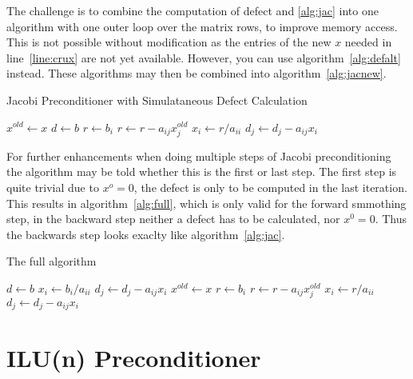 \documentclass{article}
\begin{document}
The challenge is to combine the computation of defect and \ref{alg:jac} into one algorithm with one outer loop over the matrix rows, to improve memory access. This is not possible without modification as the entries of the new $x$ needed in line~\ref{line:crux} are not yet available. However, you can use algorithm~\ref{alg:defalt} instead. These algorithms may then be combined into algorithm~\ref{alg:jacnew}.
\begin{algorithm}
\caption{Jacobi Preconditioner with Simulataneous Defect Calculation}
\label{alg:jacnew}
\begin{algorithmic}[1]
\State $x^{old}\gets x$
\State $d\gets b$
  \State $r\gets b_i$
    \State $r \gets r - a_{ij}x_j^{old}$
  \EndFor
  \State $x_i \gets r/a_{ii}$
    \State $d_j\gets d_j-a_{ij}x_i$
  \EndFor
\EndFor
\end{algorithmic}
\end{algorithm}

For further enhancements when doing multiple steps of Jacobi preconditioning the algorithm may be told whether this is the first or last step. The first step is quite trivial due to $x^o=0$, the defect is only to be computed in the last iteration. This results in algorithm~\ref{alg:full}, which is only valid for the forward smmothing step, in the backward step neither a defect has to be calculated, nor $x^0=0$. Thus the backwards step looks exaclty like algorithm~\ref{alg:jac}.

\begin{algorithm}
\caption{The full algorithm}
\label{alg:full}
\begin{algorithmic}[1]
  \State $d\gets b$
\EndIf
{}
    \State $x_i\gets b_i/a_{ii}$
  \EndFor
      \State $d_j\gets d_j - a_{ij}x_{i}$
    \EndFor
  \EndIf
\Else
  \State $x^{old}\gets x$
    \State $r\gets b_i$
      \State $r\gets r-a_{ij}x^{old}_j$
    \EndFor
    \State $x_i\gets r/a_{ii}$
        \State $d_j\gets d_j - a_{ij}x_{i}$
      \EndFor
    \EndIf
  \EndFor
\EndIf
\end{algorithmic}
\end{algorithm}

\section{ILU(n) Preconditioner}
\end{document}

